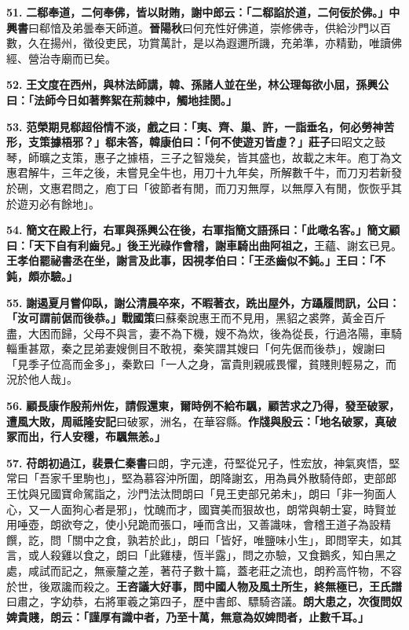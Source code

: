 \textbf{51.} \textbf{二郗奉道，二何奉佛，皆以財賄，謝中郎云：「二郗諂於道，二何佞於佛。」}{\footnotesize \textbf{中興書}曰郗愔及弟曇奉天師道。\textbf{晉陽秋}曰何充性好佛道，崇修佛寺，供給沙門以百數，久在揚州，徵役吏民，功賞萬計，是以為遐邇所譏，充弟準，亦精勤，唯讀佛經、營治寺廟而已矣。}

\textbf{52.} \textbf{王文度在西州，與林法師講，韓、孫諸人並在坐，林公理每欲小屈，孫興公曰：「法師今日如著弊絮在荊棘中，觸地挂閡。」}

\textbf{53.} \textbf{范榮期見郗超俗情不淡，戲之曰：「夷、齊、巢、許，一詣垂名，何必勞神苦形，支策據梧邪？」郗未答，韓康伯曰：「何不使遊刃皆虛？」}{\footnotesize \textbf{莊子}曰昭文之鼓琴，師曠之支策，惠子之據梧，三子之智幾矣，皆其盛也，故載之末年。庖丁為文惠君解牛，三年之後，未嘗見全牛也，用刀十九年矣，所解數千牛，而刀刃若新發於硎，文惠君問之，庖丁曰「彼節者有閒，而刀刃無厚，以無厚入有閒，恢恢乎其於遊刃必有餘地」。}

\textbf{54.} \textbf{簡文在殿上行，右軍與孫興公在後，右軍指簡文語孫曰：「此噉名客。」簡文顧曰：「天下自有利齒兒。」後王光祿作會稽，謝車騎出曲阿祖之，}{\footnotesize 王蘊、謝玄已見。}\textbf{王孝伯罷祕書丞在坐，謝言及此事，因視孝伯曰：「王丞齒似不鈍。」王曰：「不鈍，頗亦驗。」}

\textbf{55.} \textbf{謝遏夏月嘗仰臥，謝公清晨卒來，不暇著衣，跣出屋外，方躡履問訊，公曰：「汝可謂前倨而後恭。」}{\footnotesize \textbf{戰國策}曰蘇秦說惠王而不見用，黑貂之裘弊，黃金百斤盡，大困而歸，父母不與言，妻不為下機，嫂不為炊，後為從長，行過洛陽，車騎輜重甚眾，秦之昆弟妻嫂側目不敢視，秦笑謂其嫂曰「何先倨而後恭」，嫂謝曰「見季子位高而金多」，秦歎曰「一人之身，富貴則親戚畏懼，貧賤則輕易之，而況於他人哉」。}

\textbf{56.} \textbf{顧長康作殷荊州佐，請假還東，爾時例不給布颿，顧苦求之乃得，發至破冢，遭風大敗，}{\footnotesize \textbf{周祗隆安記}曰破冢，洲名，在華容縣。}\textbf{作牋與殷云：「地名破冢，真破冢而出，行人安穩，布颿無恙。」}

\textbf{57.} \textbf{苻朗初過江，}{\footnotesize \textbf{裴景仁秦書}曰朗，字元達，苻堅從兄子，性宏放，神氣爽悟，堅常曰「吾家千里駒也」，堅為慕容沖所圍，朗降謝玄，用為員外散騎侍郎，吏部郎王忱與兄國寶命駕詣之，沙門法汰問朗曰「見王吏部兄弟未」，朗曰「非一狗面人心，又一人面狗心者是邪」，忱醜而才，國寶美而狠故也，朗常與朝士宴，時賢並用唾壺，朗欲夸之，使小兒跪而張口，唾而含出，又善識味，會稽王道子為設精饌，訖，問「關中之食，孰若於此」，朗曰「皆好，唯鹽味小生」，即問宰夫，如其言，或人殺雞以食之，朗曰「此雞棲，恆半露」，問之亦驗，又食鵝炙，知白黑之處，咸試而記之，無豪釐之差，著苻子數十篇，蓋老莊之流也，朗矜高忤物，不容於世，後眾讒而殺之。}\textbf{王咨議大好事，問中國人物及風土所生，終無極已，}{\footnotesize \textbf{王氏譜}曰肅之，字幼恭，右將軍羲之第四子，歷中書郎、驃騎咨議。}\textbf{朗大患之，次復問奴婢貴賤，朗云：「謹厚有識中者，乃至十萬，無意為奴婢問者，止數千耳。」}

